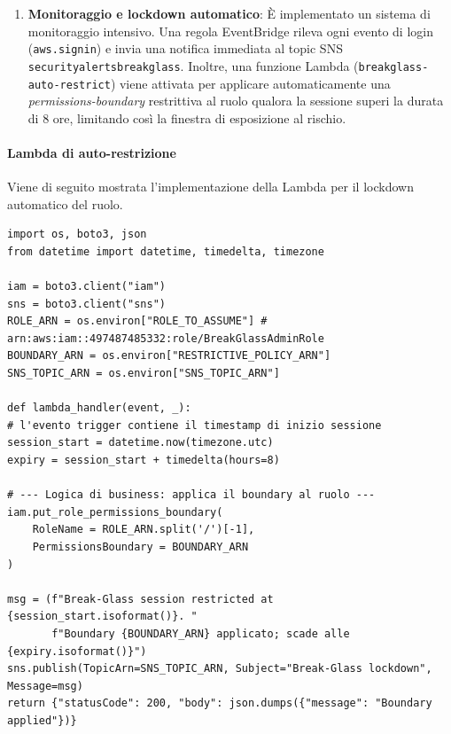 \begin{enumerate}
\item \textbf{Monitoraggio e lockdown \allowbreak{}automatico}:
È implementato un sistema di monitoraggio intensivo.
Una regola EventBridge rileva ogni evento di login (\lstinline|aws.signin|) e invia una notifica immediata al topic SNS \texttt{security\discretionary{-}{}{-}alerts\discretionary{-}{}{-}breakglass}.
Inoltre, una funzione Lambda (\texttt{breakglass-auto-restrict}) viene attivata per applicare automaticamente una \emph{permissions-boundary} restrittiva al ruolo qualora la sessione superi la durata di 8 ore, limitando così la finestra di esposizione al rischio.

\end{enumerate}

\paragraph{Lambda di auto-restrizione}
Viene di seguito mostrata l'implementazione della Lambda per il lockdown automatico del ruolo.
\begin{lstlisting}[style=python, caption={Lambda semplificata di auto-lock del ruolo}, label=lst:breakglass-lambda]
import os, boto3, json
from datetime import datetime, timedelta, timezone

iam = boto3.client("iam")
sns = boto3.client("sns")
ROLE_ARN = os.environ["ROLE_TO_ASSUME"] # arn:aws:iam::497487485332:role/BreakGlassAdminRole
BOUNDARY_ARN = os.environ["RESTRICTIVE_POLICY_ARN"]
SNS_TOPIC_ARN = os.environ["SNS_TOPIC_ARN"]

def lambda_handler(event, _):
# l'evento trigger contiene il timestamp di inizio sessione
session_start = datetime.now(timezone.utc)
expiry = session_start + timedelta(hours=8)

# --- Logica di business: applica il boundary al ruolo ---
iam.put_role_permissions_boundary(
    RoleName = ROLE_ARN.split('/')[-1],
    PermissionsBoundary = BOUNDARY_ARN
)

msg = (f"Break-Glass session restricted at {session_start.isoformat()}. "
       f"Boundary {BOUNDARY_ARN} applicato; scade alle {expiry.isoformat()}")
sns.publish(TopicArn=SNS_TOPIC_ARN, Subject="Break-Glass lockdown", Message=msg)
return {"statusCode": 200, "body": json.dumps({"message": "Boundary applied"})}


\end{lstlisting}

